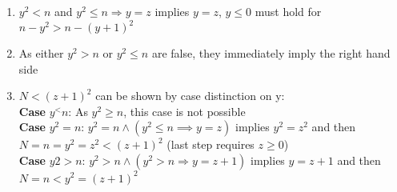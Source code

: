 \documentclass[11.5pt]{article}
\begin{document}
\begin{enumerate}[label=(\arabic*)]
    \item $y^2<n$ and $y^2 \leq n \Rightarrow y = z$ implies $y=z$, $y \leq 0$ must hold for $n-y^2 > n-(y+1)^2$
    \item As either $y^2>n$ or $y^2\leq n$ are false, they immediately imply the right hand side
    \item $N < (z+1)^2$ can be shown by case distinction on y: \\
    \textbf{Case} $y^<n$: As $y^2\geq n$, this case is not possible \\
    \textbf{Case} $y^2=n$: $y^2 = n \land (y^2 \leq n \implies y=z)$ implies $y^2=z^2$ and then $N=n=y^2 = z^2 < (z+1)^2$ (last step requires $z \geq 0$)\\
    \textbf{Case} $y2 > n$: $y^2 > n \land (y^2 >n \Rightarrow y = z+1)$ implies $y = z+1$ and then 
    $N=n < y^2 = (z+1)^2$

\end{enumerate}

\end{document}
